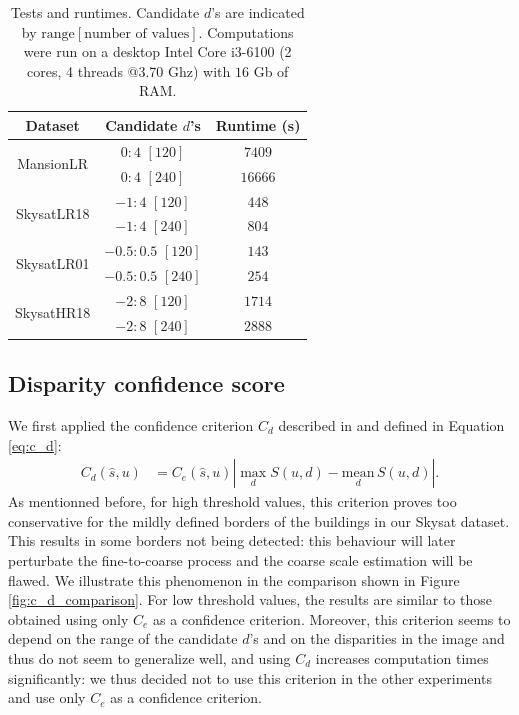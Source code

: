 \documentclass{article}
\theoremstyle{definition}
\begin{document}
\begin{table}[ht]
\centering
  \begin{tabular}{|c|c|c|}
   \hline
  \textbf{Dataset} & \textbf{Candidate $d$'s} & \textbf{Runtime (s)}\\
  \hline \hline 
  \multirow{2}{*}{MansionLR} & $0:4$ $[120]$ & $7409$\\
  & $0:4$ $[240]$ & $16666$\\
  \hline 
  \multirow{2}{*}{SkysatLR18} & $-1:4$ $[120]$ & $448$\\
  & $-1:4$ $[240]$ & $804$\\
  \hline 
  \multirow{2}{*}{SkysatLR01} & $-0.5:0.5$ $[120]$ & $143$\\
  & $-0.5:0.5$ $[240]$ & $254$\\
  \hline 
  \multirow{2}{*}{SkysatHR18} & $-2:8$ $[120]$ & $1714$\\
  & $-2:8$ $[240]$ & $2888$\\
  \hline
  \end{tabular}

 \caption{Tests and runtimes. Candidate $d$'s are indicated by $\mathrm{range}[\text{number of values}]$. Computations were run on a desktop Intel Core i3-6100 (2 cores, 4 threads @3.70 Ghz) with $16$ Gb of RAM.}
 \label{table:tests}
\end{table}


\subsection{Disparity confidence score}


We first applied the confidence criterion $C_d$ described in \cite{art:kim13:lfields} and defined in Equation \eqref{eq:c_d}:
\begin{align*}
 C_d (\widehat{s}, u) &= C_e (\widehat{s}, u) \left|\max_d S(u, d) - \underset{d}{\mathrm{mean}}\, S(u, d)\right|.
\end{align*}
As mentionned before, for high threshold values, this criterion proves too conservative for the mildly defined borders of the buildings in our Skysat dataset. This results in some borders not being detected: this behaviour will later perturbate the fine-to-coarse process and the coarse scale estimation will be flawed. We illustrate this phenomenon in the comparison shown in Figure \ref{fig:c_d_comparison}. For low threshold values, the results are similar to those obtained using only $C_e$ as a confidence criterion. Moreover, this criterion seems to depend on the range of the candidate $d$'s and on the disparities in the image and thus do not seem to generalize well, and using $C_d$ increases computation times significantly: we thus decided not to use this criterion in the other experiments and use only $C_e$ as a confidence criterion.
\end{document}
